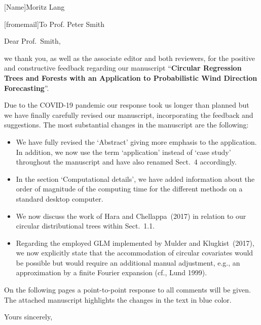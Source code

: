 \documentclass[english, noconfig]{uibklttr}
\begin{document}

[Name]{Moritz Lang}





\begin{letter}[fromemail]{To Prof. Peter Smith}
\opening{Dear Prof.\ Smith,}

we thank you, as well as the associate editor and both reviewers, for the
positive and constructive feedback regarding our manuscript ``\textbf{Circular
Regression Trees and Forests with an Application to Probabilistic Wind
Direction Forecasting}''.

\vspace{5mm}

Due to the COVID-19 pandemic our response took us longer than planned but
we have finally carefully revised our manuscript, incorporating the feedback
and suggestions. The most substantial changes in the manuscript are the following:

\begin{itemize}
\item We have fully revised the `Abstract' giving more emphasis to the application.
In addition, we now use the term `application' instead of `case study' throughout
the manuscript and have also renamed Sect.~4 accordingly.
 
\item In the section `Computational details', we have added information about the
order of magnitude of the computing time for the different methods on a standard desktop computer. 

\item We now discuss the work of Hara and Chellappa~(2017) in relation to our
circular distributional trees within Sect.~1.1.

\item Regarding the employed GLM implemented by Mulder and Klugkist~(2017), we now
explicitly state that the accommodation of circular covariates would be possible
but would require an additional manual adjustment, e.g., an approximation by a finite
Fourier expansion (cf., Lund 1999).

\end{itemize}

\vspace{5mm}

On the following pages a point-to-point response to all comments will be given.
The attached manuscript highlights the changes in the text in blue color.

\closing{Yours sincerely,}

\end{letter}
\end{document}
